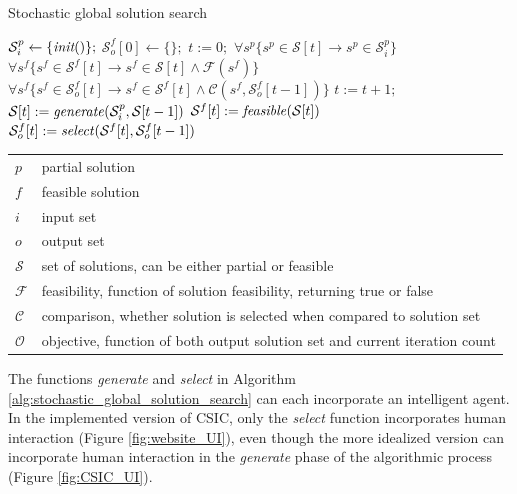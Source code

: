 \begin{algorithm}
  \caption{Stochastic global solution search}
  \label{alg:stochastic_global_solution_search}
  \begin{algorithmic}
    \STATE $\mathcal{S}^p_i \leftarrow \{\emph{init}()\};$
    \STATE $\mathcal{S}^f_o[0] \leftarrow \{\};$
    \STATE $t := 0;$
    \ENSURE $\forall s^p \{s^p \in \mathcal{S}[t] \rightarrow s^p \in \mathcal{S}^p_i\}$
    \ENSURE $\forall s^f \{s^f \in \mathcal{S}^f[t] \rightarrow s^f \in \mathcal{S}[t] \wedge \mathcal{F}(s^f)\}$
    \ENSURE $\forall s^f \{s^f \in \mathcal{S}^f_o[t] \rightarrow s^f \in \mathcal{S}^f[t] \wedge \mathcal{C}(s^f, \mathcal{S}^f_o[t - 1])\}$
    \STATE $t := t + 1;$
    \STATE $\mathcal{S}[t] := \mbox{\emph{generate}}(\mathcal{S}^p_i,\mathcal{S}[t-1])$
    \STATE $\mathcal{S}^f[t] := \mbox{\emph{feasible}}(\mathcal{S}[t])$
    \STATE $\mathcal{S}^f_o[t] := \mbox{\emph{select}}(\mathcal{S}^f[t], \mathcal{S}^f_o[t-1])$
    \ENDWHILE
  \end{algorithmic}
  \begin{tabular}{|l|l|}
  \hline
    $p$ & partial solution \\
    $f$ & feasible solution \\
    $i$ & input set \\
    $o$ & output set \\
    $\mathcal{S}$ & set of solutions, can be either partial or feasible \\
    $\mathcal{F}$ & feasibility, function of solution feasibility, returning true or false \\
    $\mathcal{C}$ & comparison, whether solution is selected when compared to solution set \\
    $\mathcal{O}$ & objective, function of both output solution set and current iteration count \\
  \hline
  \end{tabular}
\end{algorithm}

The functions \emph{generate} and \emph{select} in Algorithm \ref{alg:stochastic_global_solution_search} can each incorporate an intelligent agent.  In the implemented version of CSIC, only the \emph{select} function incorporates human interaction (Figure \ref{fig:website_UI}), even though the more idealized version can incorporate human interaction in the \emph{generate} phase of the algorithmic process (Figure \ref{fig:CSIC_UI}).  

